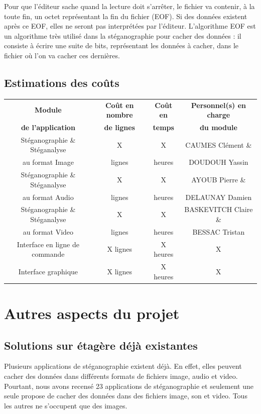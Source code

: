 \documentclass[11pt]{article}
\begin{document}
Pour que l'éditeur sache quand la lecture doit s'arrêter, le fichier va contenir, à la toute fin, un octet représentant la fin du fichier (EOF). 
Si des données existent après ce EOF, elles ne seront pas interprétées par l'éditeur. 
L'algorithme EOF est un algorithme très utilisé dans la stéganographie pour cacher des données : il consiste à écrire une suite de bits, représentant les données à cacher, dans le fichier où l'on va cacher ces dernières. 

\subsection{Estimations des coûts}
\begin{tabular}{|c|c|c|c|}
  \hline
  \textbf{Module} & \textbf{Coût en nombre} & \textbf{Coût en} & \textbf{Personnel(s) en charge} \\
   \textbf{de l'application} & \textbf{de lignes} & \textbf{temps} & \textbf{du module} \\
  \hline
  Stéganographie \& Stéganalyse & X & X & CAUMES Clément \&\\
   au format Image & lignes & heures & DOUDOUH Yassin\\
  \hline
  Stéganographie \& Stéganalyse & X & X & AYOUB Pierre \&\\
   au format Audio & lignes & heures & DELAUNAY Damien\\
  \hline
  Stéganographie \& Stéganalyse & X & X & BASKEVITCH Claire \&\\
   au format Video & lignes & heures & BESSAC Tristan\\
  \hline
  Interface en ligne de commande & X lignes & X heures & X\\ 
  \hline
  Interface graphique & X lignes & X heures & X\\
  \hline
\end{tabular}

\section{Autres aspects du projet}
\subsection{Solutions sur étagère déjà existantes}
Plusieurs applications de stéganographie existent déjà. En effet, elles peuvent cacher des données dans différents formats de fichiers image, audio et video. 
Pourtant, nous avons recensé 23 applications de stéganographie et seulement une seule propose de cacher des données dans des fichiers image, son et video. 
Tous les autres ne s'occupent que des images. 
\end{document}
